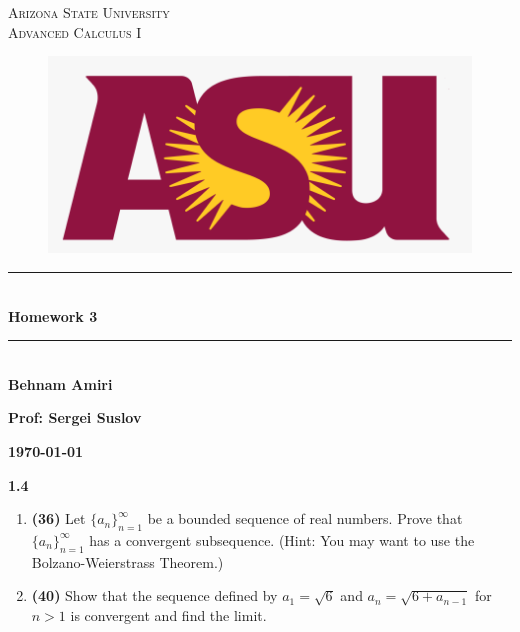 \documentclass[fleqn]{article}
\begin{document}
  \begin{titlepage}

    \newcommand{\HRule}{\rule{\linewidth}{0.5mm}}

    \center


    \textsc{\LARGE Arizona State University}\\[1.5cm]

    \textsc{\LARGE Advanced Calculus I }\\[1.5cm]


    \begin{figure}
      \includegraphics[width=\linewidth]{asu.png}
    \end{figure}


    \HRule \\[0.4cm]
    { \huge \bfseries Homework 3 }\\[0.4cm] 
    \HRule \\[1.5cm]

    \textbf{Behnam Amiri}

    \bigbreak

    \textbf{Prof: Sergei Suslov}

    \bigbreak


    \textbf{{\large \today}\\[2cm]}

    \vfill

  \end{titlepage}

  \textbf{1.4}
  \begin{enumerate}
    \item \textbf{(36)} Let $\{a_n\}_{n=1}^{\infty}$ be a bounded sequence of real numbers. Prove that
    $\{a_n\}_{n=1}^{\infty}$ has a convergent subsequence. (Hint: You may want to use the Bolzano-Weierstrass Theorem.)

    \item \textbf{(40)} Show that the sequence defined by $a_1=\sqrt{6}$ and $a_n=\sqrt{6+a_{n-1}}$ for $n > 1$ is convergent and find the limit.
  
  \end{enumerate}
\end{document}
